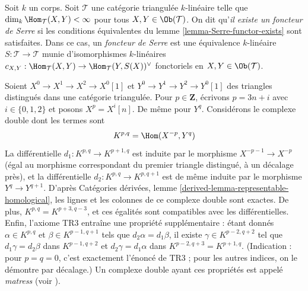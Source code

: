 \begin{definition}
\label{definition-Serre-functor}
Soit $k$ un corps. Soit $\mathcal{T}$ une catégorie triangulée
$k$-linéaire telle que $\dim_k \Hom_\mathcal{T}(X, Y) < \infty$
pour tous $X, Y \in \Ob(\mathcal{T})$. On dit qu'{\it il existe un foncteur
de Serre} si les conditions équivalentes du lemme \ref{lemma-Serre-functor-exists}
sont satisfaites. Dans ce cas, un {\it foncteur de Serre} est une équivalence $k$-linéaire
$S : \mathcal{T} \to \mathcal{T}$ munie d'isomorphismes $k$-linéaires
$c_{X, Y} : \Hom_\mathcal{T}(X, Y) \to \Hom_\mathcal{T}(Y, S(X))^\vee$
fonctoriels en $X, Y \in \Ob(\mathcal{T})$.
\end{definition}

\begin{remark}
\label{remark-matress}
Soient $X^0 \to X^1 \to X^2 \to X^0[1]$ et $Y^0 \to Y^1 \to Y^2 \to Y^0[1]$
des triangles distingués dans une catégorie triangulée. Pour
$p \in \mathbf{Z}$, écrivons $p = 3n + i$ avec $i \in \{0, 1, 2\}$ et
posons $X^p = X^i[n]$. De même pour $Y^q$. Considérons le complexe double
dont les termes sont
$$
K^{p, q} = \Hom(X^{-p}, Y^q)
$$
La différentielle $d_1 : K^{p, q} \to K^{p + 1, q}$ est induite par le morphisme
$X^{-p - 1} \to X^{-p}$ (égal au morphisme correspondant
du premier triangle distingué, à un décalage près),
et la différentielle $d_2 : K^{p, q} \to K^{p, q + 1}$ est de même induite
par le morphisme $Y^q \to Y^{q + 1}$. D'après
Catégories dérivées, lemme \ref{derived-lemma-representable-homological},
les lignes et les colonnes de ce complexe double sont exactes.
De plus, $K^{p, q} = K^{p + 3, q - 3}$, et ces
égalités sont compatibles avec les différentielles. Enfin, l'axiome TR3
entraîne une propriété supplémentaire : étant donnés
$\alpha \in K^{p, q}$ et $\beta \in K^{p - 1, q + 1}$ tels
que $d_2 \alpha = d_1 \beta$, il existe $\gamma \in K^{p - 2, q + 2}$
tel que
$d_1 \gamma = d_2 \beta $ dans $K^{p - 1, q + 2}$ et
$d_2 \gamma = d_1 \alpha $ dans $K^{p - 2, q + 3} = K^{p + 1, q}$.
(Indication : pour $p = q = 0$, c'est exactement l'énoncé de TR3 ;
pour les autres indices, on le démontre par décalage.)
Un complexe double ayant ces propriétés est appelé {\it matress}
(voir \cite{Bondal-Kapranov}).
\end{remark}

